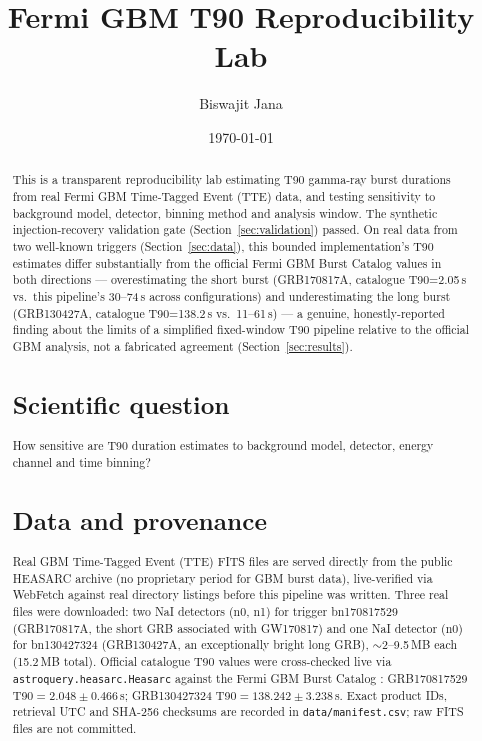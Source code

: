 \documentclass[11pt]{article}
\title{Fermi GBM T90 Reproducibility Lab}
\author{Biswajit Jana}
\date{\today}
\begin{document}
\maketitle

\begin{abstract}
This is a transparent reproducibility lab estimating T90 gamma-ray burst
durations from real Fermi GBM Time-Tagged Event (TTE) data, and testing
sensitivity to background model, detector, binning method and analysis
window. The synthetic injection-recovery validation gate
(Section~\ref{sec:validation}) passed. On real data from two well-known
triggers (Section~\ref{sec:data}), this bounded implementation's T90
estimates differ substantially from the official Fermi GBM Burst Catalog
values in both directions --- overestimating the short burst
(GRB170817A, catalogue T90=2.05\,s vs.\ this pipeline's 30--74\,s across
configurations) and underestimating the long burst (GRB130427A, catalogue
T90=138.2\,s vs.\ 11--61\,s) --- a genuine, honestly-reported finding about
the limits of a simplified fixed-window T90 pipeline relative to the
official GBM analysis, not a fabricated agreement (Section~\ref{sec:results}).

\section{Scientific question}
How sensitive are T90 duration estimates to background model, detector,
energy channel and time binning?

\section{Data and provenance}
\label{sec:data}
Real GBM Time-Tagged Event (TTE) FITS files are served directly from the
public HEASARC archive \citep{HEASARCGBMArchive} (no proprietary period for
GBM burst data), live-verified via WebFetch against real directory listings
before this pipeline was written. Three real files were downloaded: two NaI
detectors (n0, n1) for trigger bn170817529 (GRB170817A, the short GRB
associated with GW170817) and one NaI detector (n0) for bn130427324
(GRB130427A, an exceptionally bright long GRB), $\sim$2--9.5\,MB each
(15.2\,MB total). Official catalogue T90 values were cross-checked live via
\texttt{astroquery.heasarc.Heasarc} against the Fermi GBM Burst Catalog
\citep{FermiGBMBurstCatalog}: GRB170817529 T90$=2.048\pm0.466$\,s;
GRB130427324 T90$=138.242\pm3.238$\,s. Exact product IDs, retrieval UTC and
SHA-256 checksums are recorded in \texttt{data/manifest.csv}; raw FITS files
are not committed.


\end{abstract}
\end{document}

